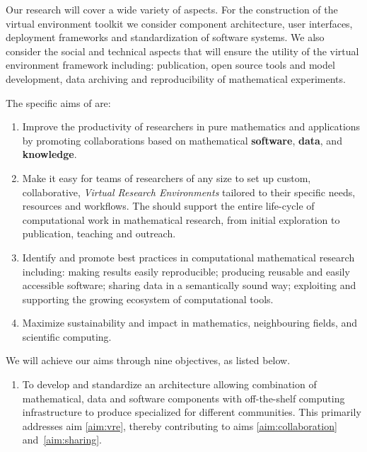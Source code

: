 \documentclass[noworkareas,deliverables,\classoptions]{euproposal}       %
\begin{document}
\begin{proposal}
Our research will cover a wide variety of aspects. For the
construction of the \TheProject virtual environment toolkit we
consider component architecture, user interfaces, deployment
frameworks and standardization of software systems.  We also consider
the social and technical aspects that will ensure the utility of the
virtual environment framework including: publication, open source
tools and model development, data archiving and reproducibility of
mathematical experiments.

The specific aims of \TheProject are:
\begin{enumerate}
\item \label{aim:collaboration} Improve the productivity of
  researchers in pure mathematics and applications by promoting
  collaborations based on mathematical \textbf{software},
  \textbf{data}, and \textbf{knowledge}.
\item \label{aim:vre} Make it easy for teams of researchers of any
  size to set up custom, collaborative, \emph{Virtual Research
    Environments} tailored to their specific needs, resources and
  workflows. The \VREs should support the entire life-cycle of
  computational work in mathematical research, from initial
  exploration to publication, teaching and outreach.
\item \label{aim:sharing} Identify and promote best practices in
  computational mathematical research including: making results easily
  reproducible; producing reusable and easily accessible
  software; sharing data in a semantically sound way; exploiting and
  supporting the growing ecosystem of computational tools.
\item \label{aim:impact} Maximize sustainability and impact in
  mathematics, neighbouring fields, and scientific computing.
\end{enumerate}

We will achieve our aims through nine objectives, as listed below.

\begin{enumerate}
\item\label{objective:framework} To develop and standardize an
  architecture allowing combination of mathematical, data and software
  components with off-the-shelf computing infrastructure to produce
  specialized \VREs for different communities. 
  This
  primarily addresses aim \ref{aim:vre}, thereby contributing to aims
  \ref{aim:collaboration} and~\ref{aim:sharing}. %


\end{enumerate}
\end{proposal}
\end{document}
